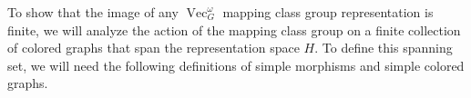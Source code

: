 \documentclass{amsart}
\newtheorem{prop}[thm]{Proposition}
\DeclareMathOperator{\MCG}{MCG}
\DeclareMathOperator{\Vect}{Vec}
\DeclareMathOperator{\Homeo}{Homeo}
\DeclareMathOperator{\Hom}{Hom}
\DeclareMathOperator{\ev}{ev}
\newcommand{\one}{1}
\begin{document}




\newcommand{\B}{\mathcal B}





To show that the image of any $\Vect_G^\omega$ mapping class group representation is finite, we will analyze the action of the mapping class group on a finite collection of colored graphs that span the representation space $H$.  To define this spanning set, we will need the following definitions of simple morphisms and simple colored graphs.
\end{document}
